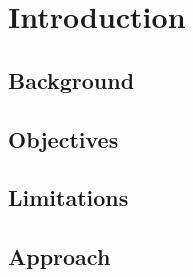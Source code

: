 \chapter{Introduction}

\section{Background}

\section{Objectives}

\section{Limitations}

\section{Approach}

